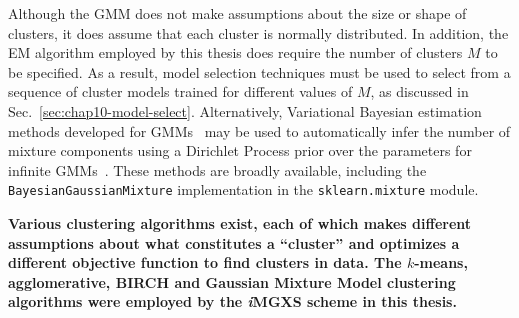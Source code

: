 Although the \ac{GMM} does not make assumptions about the size or shape of clusters, it does assume that each cluster is normally distributed. In addition, the EM algorithm employed by this thesis does require the number of clusters $M$ to be specified. As a result, model selection techniques must be used to select from a sequence of cluster models trained for different values of $M$, as discussed in Sec.~\ref{sec:chap10-model-select}. Alternatively, Variational Bayesian estimation methods developed for \acp{GMM}~\cite{attias2000variational,blei2006variational} may be used to automatically infer the number of mixture components using a Dirichlet Process prior over the parameters for infinite \acp{GMM}~\cite{ferguson1973dirichlet}. These methods are broadly available, including the \texttt{BayesianGaussianMixture} implementation in the \texttt{sklearn.mixture} module.

\begin{emphbox}
\textbf{Various clustering algorithms exist, each of which makes different assumptions about what constitutes a ``cluster'' and optimizes a different objective function to find clusters in data. The $k$-means, agglomerative, BIRCH and Gaussian Mixture Model clustering algorithms were employed by the \textit{i}\ac{MGXS} scheme in this thesis.}
\end{emphbox}







